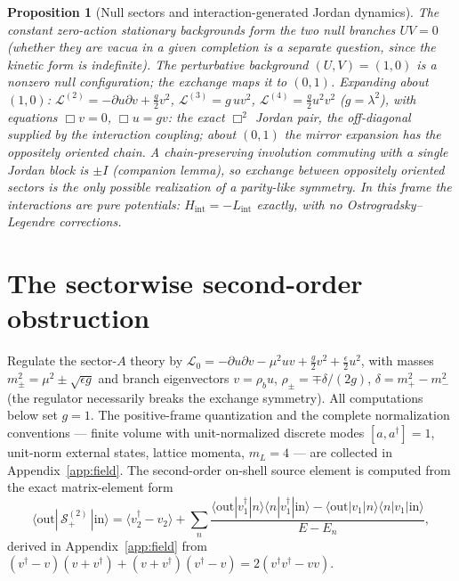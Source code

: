 \documentclass[11pt]{article}
\newtheorem{proposition}[theorem]{Proposition}
\theoremstyle{definition}
\theoremstyle{remark}
\newcommand{\dg}{\dagger}
\begin{document}
\begin{proposition}[Null sectors and interaction-generated Jordan
dynamics]\label{prop:sectors}
The constant zero-action stationary backgrounds form the two null
branches $UV=0$ (whether they are vacua in a given completion is a
separate question, since the kinetic form is indefinite).  The
perturbative background $(U,V)=(1,0)$ is a nonzero null configuration;
the exchange maps it to $(0,1)$.  Expanding about $(1,0)$:
$\mathcal L^{(2)}=-\partial u\partial v+\tfrac g2v^2$,
$\mathcal L^{(3)}=g\,uv^2$, $\mathcal L^{(4)}=\tfrac g2u^2v^2$
($g=\lambda^2$), with equations $\Box v=0$, $\Box u=gv$: the exact
$\Box^2$ Jordan pair, the off-diagonal supplied by the interaction
coupling; about $(0,1)$ the mirror expansion has the oppositely
oriented chain.  A chain-preserving involution commuting with a single
Jordan block is $\pm I$ (companion lemma), so exchange between
oppositely oriented sectors is the only possible realization of a
parity-like symmetry.  In this frame the interactions are pure
potentials: $H_{\mathrm{int}}=-L_{\mathrm{int}}$ exactly, with no
Ostrogradsky--Legendre corrections.
\end{proposition}

\section{The sectorwise second-order obstruction}\label{sec:sector}

Regulate the sector-$A$ theory by
$\mathcal L_0=-\partial u\partial v-\mu^2uv+\tfrac g2v^2
+\tfrac\epsilon2u^2$, with masses $m_\pm^2=\mu^2\pm\sqrt{\epsilon g}$
and branch eigenvectors $v=\rho_bu$,
$\rho_\pm=\mp\delta/(2g)$, $\delta=m_+^2-m_-^2$ (the regulator
necessarily breaks the exchange symmetry).  All computations below set
$g=1$.  The positive-frame quantization and the complete normalization
conventions --- finite volume with unit-normalized discrete modes
$[a,a^{\dg}]=1$, unit-norm external states, lattice momenta, $m_L=4$
--- are collected in Appendix~\ref{app:field}.  The second-order
on-shell source element is computed from the exact matrix-element form
\begin{equation}\label{eq:sourceME}
\langle\mathrm{out}|\,\mathcal S^{(2)}_+\,|\mathrm{in}\rangle
=\langle v_2^{\dg}-v_2\rangle
+\sum_n\frac{\langle\mathrm{out}|v_1^{\dg}|n\rangle
\langle n|v_1^{\dg}|\mathrm{in}\rangle
-\langle\mathrm{out}|v_1|n\rangle\langle n|v_1|\mathrm{in}\rangle}
{E-E_n},
\end{equation}
derived in Appendix~\ref{app:field} from
$(v^{\dg}-v)(v+v^{\dg})+(v+v^{\dg})(v^{\dg}-v)=2(v^{\dg}v^{\dg}-vv)$.
\end{document}
